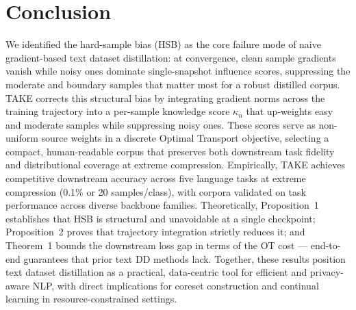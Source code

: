 \section{Conclusion} \label{sec:57-research03-conclusion}

\begin{foldable} %
    We identified the hard-sample bias (HSB) as the core failure mode of naive gradient-based text dataset distillation: at convergence, clean sample gradients vanish while noisy ones dominate single-snapshot influence scores, suppressing the moderate and boundary samples that matter most for a robust distilled corpus.
    TAKE corrects this structural bias by integrating gradient norms across the training trajectory into a per-sample knowledge score $\kappa_n$ that up-weights easy and moderate samples while suppressing noisy ones.
    These scores serve as non-uniform source weights in a discrete Optimal Transport objective, selecting a compact, human-readable corpus that preserves both downstream task fidelity and distributional coverage at extreme compression.
    Empirically, TAKE achieves competitive downstream accuracy across five language tasks at extreme compression (0.1\% or 20 samples/class), with corpora validated on task performance across diverse backbone families.
    Theoretically, Proposition~1 establishes that HSB is structural and unavoidable at a single checkpoint; Proposition~2 proves that trajectory integration strictly reduces it; and Theorem~1 bounds the downstream loss gap in terms of the OT cost --- end-to-end guarantees that prior text DD methods lack.
    Together, these results position text dataset distillation as a practical, data-centric tool for efficient and privacy-aware NLP, with direct implications for coreset construction and continual learning in resource-constrained settings.
\end{foldable}
